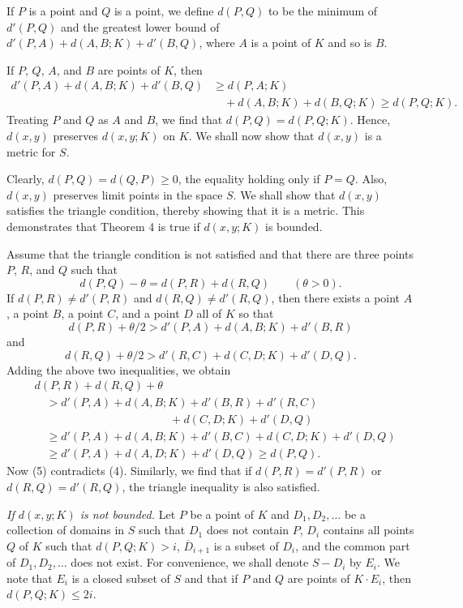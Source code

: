 \documentclass[11pt,a4paper,leqno,twoside]{article}
\begin{document}
If $P$ is a point and $Q$ is a point, we define $d(P,Q)$ to be the minimum of $d'(P,Q)$ and the greatest lower bound of $d'(P,A)+d(A,B;K)+d'(B,Q)$, where $A$ is a point of $K$ and so is $B$.

If $P$, $Q$, $A$, and $B$ are points of $K$, then
\[
\begin{aligned}
d'(P,A)+d(A,B;K)+d'(B,Q)&\geq d(P,A;K)\\
&\quad+d(A,B;K)+d(B,Q;K)\geq d(P,Q;K).
\end{aligned}
\]
\newpage
\noindent Treating $P$ and $Q$ as $A$ and $B$, we find that $d(P,Q)=d(P,Q;K)$. Hence, $d(x,y)$ preserves $d(x,y;K)$ on $K$. We shall now show that $d(x,y)$ is a metric for $S$.

Clearly, $d(P,Q)=d(Q,P)\geq0$, the equality holding only if $P=Q$. Also, $d(x,y)$ preserves limit points in the space $S$. We shall show that $d(x,y)$ satisfies the triangle condition, thereby showing that it is a metric. This demonstrates that Theorem 4 is true if $d(x,y;K)$ is bounded.

Assume that the triangle condition is not satisfied and that there are three points $P$, $R$, and $Q$ such that
\begin{equation}\tag{4}
d(P,Q)-\theta=d(P,R)+d(R,Q)\qquad(\theta>0).
\end{equation}
If $d(P,R)\ne d'(P,R)$ and $d(R,Q)\ne d'(R,Q)$, then there exists a point $A$, a point $B$, a point $C$, and a point $D$ all of $K$ so that
\[
d(P,R)+\theta/2>d'(P,A)+d(A,B;K)+d'(B,R)
\]
and
\[
d(R,Q)+\theta/2>d'(R,C)+d(C,D;K)+d'(D,Q).
\]
Adding the above two inequalities, we obtain
\begin{equation}\tag{5}
\begin{aligned}
&d(P,R)+d(R,Q)+\theta\\
&\quad>d'(P,A)+d(A,B;K)+d'(B,R)+d'(R,C)\\
&\hspace{5cm}+d(C,D;K)+d'(D,Q)\\
&\quad\geq d'(P,A)+d(A,B;K)+d'(B,C)+d(C,D;K)+d'(D,Q)\\
&\quad\geq d'(P,A)+d(A,D;K)+d'(D,Q)\geq d(P,Q).
\end{aligned}
\end{equation}
Now (5) contradicts (4). Similarly, we find that if $d(P,R)=d'(P,R)$ or $d(R,Q)=d'(R,Q)$, the triangle inequality is also satisfied.

\textit{If $d(x,y;K)$ is not bounded.} Let $P$ be a point of $K$ and $D_1,D_2,\ldots$ be a collection of domains in $S$ such that $D_1$ does not contain $P$, $D_i$ contains all points $Q$ of $K$ such that $d(P,Q;K)>i$, $\overline D_{i+1}$ is a subset of $D_i$, and the common part of $D_1,D_2,\ldots$ does not exist. For convenience, we shall denote $S-D_i$ by $E_i$. We note that $E_i$ is a closed subset of $S$ and that if $P$ and $Q$ are points of $K\cdot E_i$, then $d(P,Q;K)\leq2i$.
\end{document}

